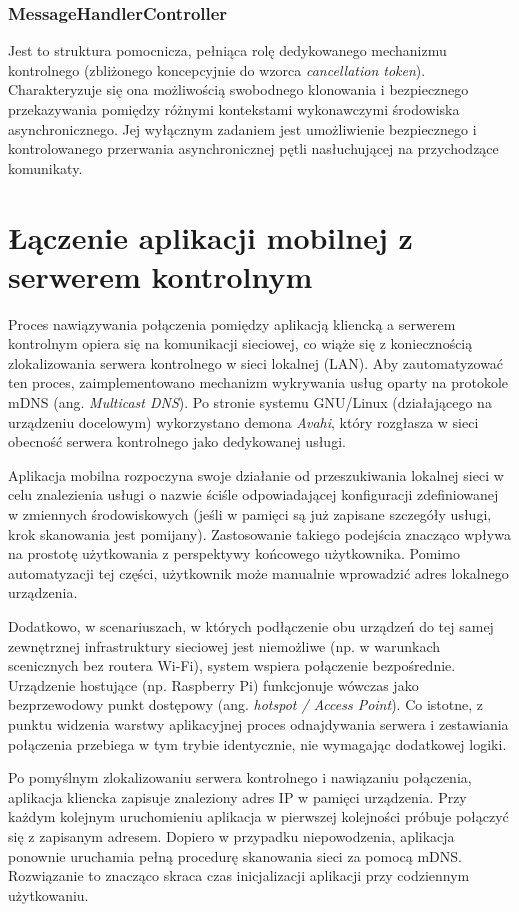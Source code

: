 \documentclass[12pt,a4paper]{report}
\begin{document}
\subsubsection{MessageHandlerController}
Jest to struktura pomocnicza, pełniąca rolę dedykowanego mechanizmu
kontrolnego (zbliżonego koncepcyjnie do wzorca \textit{cancellation
token}). Charakteryzuje się ona możliwością swobodnego klonowania i
bezpiecznego przekazywania pomiędzy różnymi kontekstami wykonawczymi
środowiska asynchronicznego. Jej wyłącznym zadaniem jest umożliwienie
bezpiecznego i kontrolowanego przerwania asynchronicznej pętli
nasłuchującej na przychodzące komunikaty.

\section{Łączenie aplikacji mobilnej z serwerem kontrolnym}

Proces nawiązywania połączenia pomiędzy aplikacją kliencką a serwerem
kontrolnym opiera się na komunikacji sieciowej, co wiąże się z
koniecznością zlokalizowania serwera kontrolnego w sieci lokalnej
(LAN). Aby zautomatyzować ten proces, zaimplementowano mechanizm
wykrywania usług oparty na protokole mDNS (ang. \textit{Multicast
DNS}). Po stronie systemu GNU/Linux (działającego na urządzeniu
docelowym) wykorzystano demona \textit{Avahi}, który rozgłasza w
sieci obecność serwera kontrolnego jako dedykowanej usługi.

Aplikacja mobilna rozpoczyna swoje działanie od przeszukiwania
lokalnej sieci w celu znalezienia usługi o nazwie ściśle
odpowiadającej konfiguracji zdefiniowanej w zmiennych środowiskowych
(jeśli w pamięci są już zapisane szczegóły usługi, krok skanowania
jest pomijany).
Zastosowanie takiego podejścia znacząco wpływa na prostotę
użytkowania z perspektywy końcowego użytkownika. Pomimo automatyzacji
tej części, użytkownik może manualnie wprowadzić adres lokalnego urządzenia.

Dodatkowo, w scenariuszach, w których podłączenie obu urządzeń do tej
samej zewnętrznej infrastruktury sieciowej jest niemożliwe (np. w
warunkach scenicznych bez routera Wi-Fi), system wspiera połączenie
bezpośrednie. Urządzenie hostujące (np. Raspberry Pi) funkcjonuje
wówczas jako bezprzewodowy punkt dostępowy (ang. \textit{hotspot /
Access Point}). Co istotne, z punktu widzenia warstwy aplikacyjnej
proces odnajdywania serwera i zestawiania połączenia przebiega w tym
trybie identycznie, nie wymagając dodatkowej logiki.

Po pomyślnym zlokalizowaniu serwera kontrolnego i nawiązaniu
połączenia, aplikacja kliencka zapisuje znaleziony adres IP w pamięci
urządzenia. Przy każdym kolejnym uruchomieniu aplikacja w pierwszej
kolejności próbuje połączyć się z zapisanym adresem. Dopiero w
przypadku niepowodzenia, aplikacja ponownie uruchamia pełną procedurę
skanowania sieci za pomocą mDNS. Rozwiązanie to znacząco skraca czas
inicjalizacji aplikacji przy codziennym użytkowaniu.
\end{document}
